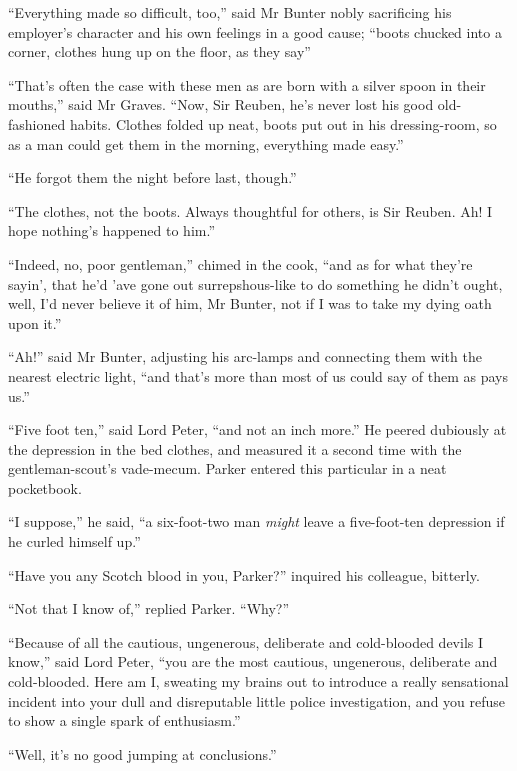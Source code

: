 \enquote{Everything made so difficult, too,} said Mr Bunter nobly sacrificing his employer’s character and his own feelings in a good cause; \enquote{boots chucked into a corner, clothes hung up on the floor, as they say\longdash}

\enquote{That’s often the case with these men as are born with a silver spoon in their mouths,} said Mr Graves. \enquote{Now, Sir Reuben, he’s never lost his good old-fashioned habits. Clothes folded up neat, boots put out in his dressing-room, so as a man could get them in the morning, everything made easy.}

\enquote{He forgot them the night before last, though.}

\enquote{The clothes, not the boots. Always thoughtful for others, is Sir Reuben. Ah! I hope nothing’s happened to him.}

\enquote{Indeed, no, poor gentleman,} chimed in the cook, \enquote{and as for what they’re sayin’, that he’d ’ave gone out surrepshous-like to do something he didn’t ought, well, I’d never believe it of him, Mr Bunter, not if I was to take my dying oath upon it.}

\enquote{Ah!} said Mr Bunter, adjusting his arc-lamps and connecting them with the nearest electric light, \enquote{and that’s more than most of us could say of them as pays us.}

\enquote{Five foot ten,} said Lord Peter, \enquote{and not an inch more.} He peered dubiously at the depression in the bed clothes, and measured it a second time with the gentleman-scout’s vade-mecum. Parker entered this particular in a neat pocketbook.

\enquote{I suppose,} he said, \enquote{a six-foot-two man \textit{might} leave a five-foot-ten depression if he curled himself up.}

\enquote{Have you any Scotch blood in you, Parker?} inquired his colleague, bitterly.

\enquote{Not that I know of,} replied Parker. \enquote{Why?}

\enquote{Because of all the cautious, ungenerous, deliberate and cold-blooded devils I know,} said Lord Peter, \enquote{you are the most cautious, ungenerous, deliberate and cold-blooded. Here am I, sweating my brains out to introduce a really sensational incident into your dull and disreputable little police investigation, and you refuse to show a single spark of enthusiasm.}

\enquote{Well, it’s no good jumping at conclusions.}

